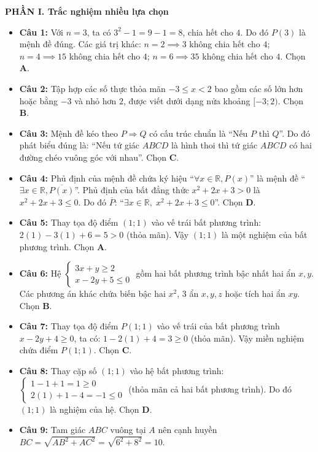 \documentclass[12pt,a4paper]{article}
\begin{document}
\textbf{PHẦN I. Trắc nghiệm nhiều lựa chọn}
\begin{itemize}[leftmargin=0.6cm, itemsep=1.5pt, topsep=1pt]
    \item \textbf{Câu 1:} Với $n = 3$, ta có $3^2 - 1 = 9 - 1 = 8$, chia hết cho $4$. Do đó $P(3)$ là mệnh đề đúng. Các giá trị khác: $n=2 \implies 3$ không chia hết cho $4$; $n=4 \implies 15$ không chia hết cho $4$; $n=6 \implies 35$ không chia hết cho $4$. Chọn \textbf{A}.
    \item \textbf{Câu 2:} Tập hợp các số thực thỏa mãn $-3 \le x < 2$ bao gồm các số lớn hơn hoặc bằng $-3$ và nhỏ hơn $2$, được viết dưới dạng nửa khoảng $[-3; 2)$. Chọn \textbf{B}.
    \item \textbf{Câu 3:} Mệnh đề kéo theo $P \Rightarrow Q$ có cấu trúc chuẩn là ``Nếu $P$ thì $Q$''. Do đó phát biểu đúng là: ``Nếu tứ giác $ABCD$ là hình thoi thì tứ giác $ABCD$ có hai đường chéo vuông góc với nhau''. Chọn \textbf{C}.
    \item \textbf{Câu 4:} Phủ định của mệnh đề chứa ký hiệu ``$\forall x \in \mathbb{R}, P(x)$'' là mệnh đề ``$\exists x \in \mathbb{R}, \overline{P(x)}$''. Phủ định của bất đẳng thức $x^2 + 2x + 3 > 0$ là $x^2 + 2x + 3 \le 0$. Do đó $\overline{P}$: ``$\exists x \in \mathbb{R},\; x^2 + 2x + 3 \le 0$''. Chọn \textbf{D}.
    \item \textbf{Câu 5:} Thay tọa độ điểm $(1; 1)$ vào vế trái bất phương trình: $2(1) - 3(1) + 6 = 5 > 0$ (thỏa mãn). Vậy $(1; 1)$ là một nghiệm của bất phương trình. Chọn \textbf{A}.
    \item \textbf{Câu 6:} Hệ $\begin{cases} 3x + y \ge 2 \\ x - 2y + 5 \le 0 \end{cases}$ gồm hai bất phương trình bậc nhất hai ẩn $x, y$. Các phương án khác chứa biến bậc hai $x^2$, 3 ẩn $x, y, z$ hoặc tích hai ẩn $xy$. Chọn \textbf{B}.
    \item \textbf{Câu 7:} Thay tọa độ điểm $P(1; 1)$ vào vế trái của bất phương trình $x - 2y + 4 \ge 0$, ta có: $1 - 2(1) + 4 = 3 \ge 0$ (thỏa mãn). Vậy miền nghiệm chứa điểm $P(1; 1)$. Chọn \textbf{C}.
    \item \textbf{Câu 8:} Thay cặp số $(1; 1)$ vào hệ bất phương trình:
    $\begin{cases} 1 - 1 + 1 = 1 \ge 0 \\ 2(1) + 1 - 4 = -1 \le 0 \end{cases}$ (thỏa mãn cả hai bất phương trình). Do đó $(1; 1)$ là nghiệm của hệ. Chọn \textbf{D}.
    \item \textbf{Câu 9:} Tam giác $ABC$ vuông tại $A$ nên cạnh huyền $BC = \sqrt{AB^2 + AC^2} = \sqrt{6^2 + 8^2} = 10$.

\end{itemize}
\end{document}
